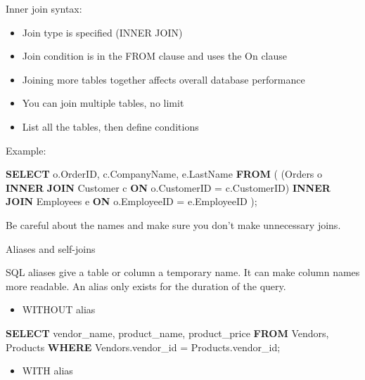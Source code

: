 \documentclass[]{book}
\newenvironment{Shaded}{\begin{snugshade}}{\end{snugshade}}
\newcommand{\KeywordTok}[1]{\textcolor[rgb]{0.13,0.29,0.53}{\textbf{{#1}}}}
\newcommand{\NormalTok}[1]{{#1}}
\providecommand{\tightlist}{%
  \setlength{\itemsep}{0pt}\setlength{\parskip}{0pt}}
\theoremstyle{definition}
\theoremstyle{definition}
\theoremstyle{remark}
\begin{document}
Inner join syntax:

\begin{itemize}
\tightlist
\item
  Join type is specified (INNER JOIN)
\item
  Join condition is in the FROM clause and uses the On clause
\item
  Joining more tables together affects overall database performance
\item
  You can join multiple tables, no limit
\item
  List all the tables, then define conditions
\end{itemize}

Example:

\begin{Shaded}
\begin{Highlighting}[]
\KeywordTok{SELECT} \NormalTok{o.OrderID, c.CompanyName, e.LastName}
\KeywordTok{FROM} \NormalTok{( (Orders o }\KeywordTok{INNER} \KeywordTok{JOIN} \NormalTok{Customer c }\KeywordTok{ON} \NormalTok{o.CustomerID = c.CustomerID)}
\KeywordTok{INNER} \KeywordTok{JOIN} \NormalTok{Employees e }\KeywordTok{ON} \NormalTok{o.EmployeeID = e.EmployeeID}
\NormalTok{);}
\end{Highlighting}
\end{Shaded}

Be careful about the names and make sure you don't make unnecessary
joins.

Aliases and self-joins

SQL aliases give a table or column a temporary name. It can make column
names more readable. An alias only exists for the duration of the query.

\begin{itemize}
\tightlist
\item
  WITHOUT alias
\end{itemize}

\begin{Shaded}
\begin{Highlighting}[]
\KeywordTok{SELECT} \NormalTok{vendor_name, product_name, product_price}
\KeywordTok{FROM} \NormalTok{Vendors, Products}
\KeywordTok{WHERE} \NormalTok{Vendors.vendor_id = Products.vendor_id;}
\end{Highlighting}
\end{Shaded}

\begin{itemize}
\tightlist
\item
  WITH alias
\end{itemize}
\end{document}
